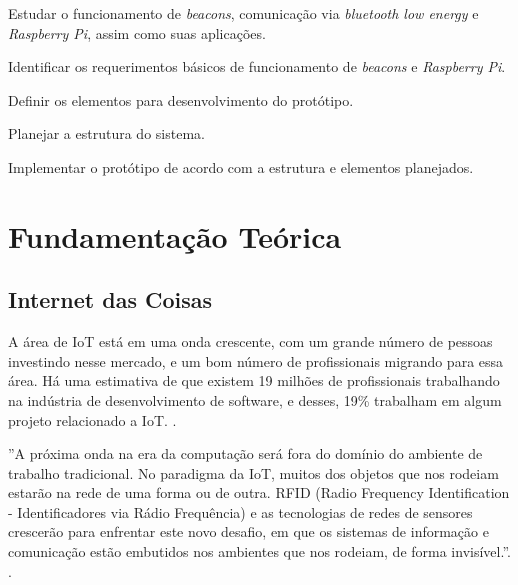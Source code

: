 \documentclass[
		12pt,				%
		openright,			%
		oneside,			%
		a4paper,			%
		chapter=TITLE,		%
		english,			%
		brazil				%
	]{abntex2}
\begin{document}
\begin{alineas}
	\item Estudar o funcionamento de \textit{beacons}, comunicação via \textit{bluetooth low energy} e \textit{Raspberry Pi}, assim como suas aplicações.
	\item Identificar os requerimentos básicos de funcionamento de \textit{beacons} e \textit{Raspberry Pi}.
	\item Definir os elementos para desenvolvimento do protótipo.
	\item Planejar a estrutura do sistema.
	\item Implementar o protótipo de acordo com a estrutura e elementos planejados.
\end{alineas}



\chapter{Fundamentação Teórica}\label{cap:fundamentacao-teorica}

\section{Internet das Coisas}\label{sec:internet-das-coisas}

A área de IoT está em uma onda crescente, com um grande número de pessoas investindo nesse mercado, e um bom número de profissionais migrando para essa área. Há uma estimativa de que existem 19 milhões de profissionais trabalhando na indústria de desenvolvimento de software, e desses, 19\% trabalham em algum projeto relacionado a IoT. \cite{cw-iot}.

\begin{citacao}
''A próxima onda na era da computação será fora do domínio do ambiente de trabalho tradicional. No paradigma da IoT, muitos dos objetos que nos rodeiam estarão na rede de uma forma ou de outra. RFID (Radio Frequency Identification - Identificadores via Rádio Frequência) e as tecnologias de redes de sensores crescerão para enfrentar este novo desafio, em que os sistemas de informação e comunicação estão embutidos nos ambientes que nos rodeiam, de forma invisível.''. \cite{iot-article}. 
\end{citacao}
\end{document}
